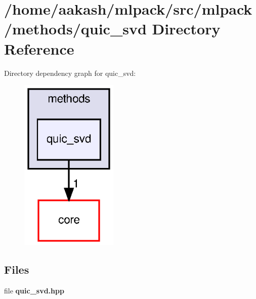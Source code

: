 \section{/home/aakash/mlpack/src/mlpack/methods/quic\+\_\+svd Directory Reference}
\label{dir_d5b6866e35aa9a05a7a312d572562d99}
Directory dependency graph for quic\+\_\+svd\+:
\nopagebreak
\begin{figure}[H]
\begin{center}
\leavevmode
\includegraphics[width=132pt]{dir_d5b6866e35aa9a05a7a312d572562d99_dep}
\end{center}
\end{figure}
\subsection*{Files}
\begin{DoxyCompactItemize}
\item 
file \textbf{ quic\+\_\+svd.\+hpp}
\end{DoxyCompactItemize}
